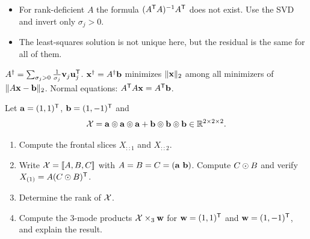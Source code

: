 \begin{solution}
\begin{trap}
\begin{itemize}
\item For rank-deficient $A$ the formula $(A^{\mathsf{T}} A)^{-1}A^{\mathsf{T}}$ does not exist. Use the SVD and invert only $\sigma_j>0$.
\item The least-squares solution is not unique here, but the residual is the same for all of them.
\end{itemize}
\end{trap}
\begin{heart}
$A^\dagger=\sum_{\sigma_j>0}\frac1{\sigma_j}\mathbf{v}_j\mathbf{u}_j^{\mathsf{T}}$. $\mathbf{x}^\dagger=A^\dagger\mathbf{b}$ minimizes $\lVert \mathbf{x}\rVert_2$ among all minimizers of $\lVert A\mathbf{x}-\mathbf{b}\rVert_2$. Normal equations: $A^{\mathsf{T}} A\mathbf{x}=A^{\mathsf{T}}\mathbf{b}$.
\end{heart}
\end{solution}

Let $\mathbf{a}=(1,1)^{\mathsf{T}}$, $\mathbf{b}=(1,-1)^{\mathsf{T}}$ and
\[
\mathcal{X}=\mathbf{a}\circledcirc\mathbf{a}\circledcirc\mathbf{a}+\mathbf{b}\circledcirc\mathbf{b}\circledcirc\mathbf{b}\in\mathbb{R}^{2\times2\times2}.
\]
\begin{enumerate}
\item Compute the frontal slices $X_{::1}$ and $X_{::2}$.
\item Write $\mathcal{X}=[\![A,B,C]\!]$ with $A=B=C=(\mathbf{a}\ \mathbf{b})$. Compute $C\odot B$ and verify $X_{(1)}=A(C\odot B)^{\mathsf{T}}$.
\item Determine the rank of $\mathcal{X}$.
\item Compute the 3-mode products $\mathcal{X}\times_3\mathbf{w}$ for $\mathbf{w}=(1,1)^{\mathsf{T}}$ and $\mathbf{w}=(1,-1)^{\mathsf{T}}$, and explain the result.
\end{enumerate}

